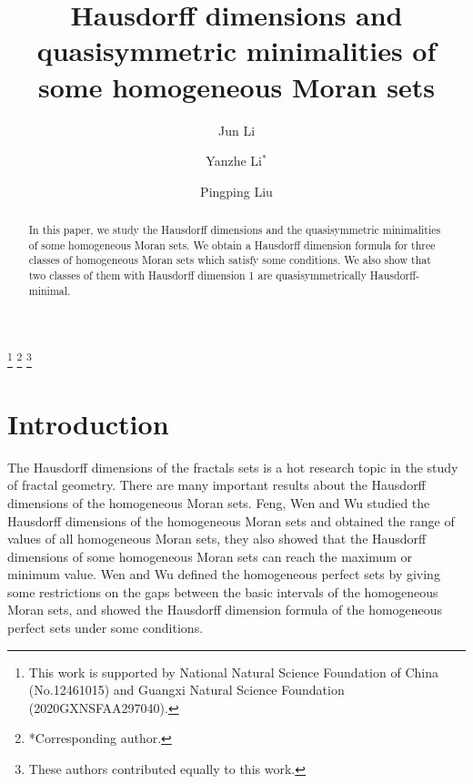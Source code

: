 \documentclass[reqno]{amsart}
\theoremstyle{plain}
\theoremstyle{definition}
\theoremstyle{remark}
\numberwithin{equation}{section} \DeclareMathOperator\intr{int}
\begin{document}
\title{Hausdorff dimensions and quasisymmetric minimalities of some homogeneous Moran sets}
\author{Jun Li}
\address[Jun Li]{School of Mathematics, Guangxi University, Nanning, 530004, P.~R. China}


\author{Yanzhe Li$^{*}$}
\address[Yanzhe Li]{School of Mathematics, Guangxi University; Guangxi Center for Mathematical Research; Center for Applied Mathematics of Guangxi(Guangxi University), Nanning, 530004, P.~R. China}


\author{Pingping Liu}
\address[Pingping Liu]{School  of Mathematics, Guangxi University, Nanning, 530004, P.~R. China}

\thanks{This work is supported by National Natural Science Foundation of China (No.12461015) and Guangxi Natural Science Foundation (2020GXNSFAA297040). }
\thanks{*Corresponding author. }
\thanks{These authors contributed equally to this work.}

\begin{abstract}
In this paper, we study the Hausdorff dimensions and the quasisymmetric  minimalities of some homogeneous Moran sets. We obtain a Hausdorff dimension formula for three classes of homogeneous Moran sets which satisfy some conditions. We also show that two classes of them with Hausdorff dimension 1 are quasisymmetrically  Hausdorff-minimal.
\end{abstract}

\maketitle



\section{Introduction}
\label{sec:intro}






The Hausdorff dimensions of the fractals sets is a hot research topic in the study of fractal geometry.
There are many important results about the Hausdorff dimensions of the homogeneous Moran sets. Feng, Wen and Wu\cite{fdj97} studied the Hausdorff dimensions of the homogeneous Moran sets and obtained the range of values of all homogeneous Moran sets, they also showed that the Hausdorff dimensions of some homogeneous Moran sets can reach the maximum or minimum value.
Wen and Wu\cite{wzywuj05} defined the homogeneous perfect sets by giving some restrictions on the gaps between the basic intervals of the homogeneous Moran sets, and  showed  the Hausdorff dimension formula of the homogeneous perfect sets  under some conditions.
\end{document}

